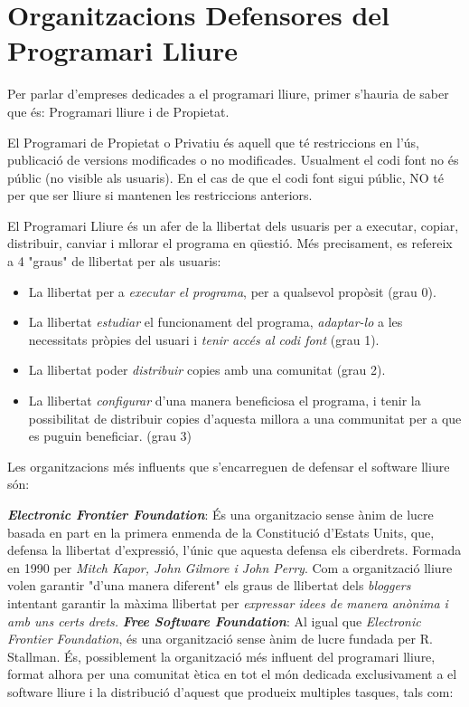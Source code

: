 \section{Organitzacions Defensores del Programari Lliure}

Per parlar d'empreses dedicades a el programari lliure, primer s'hauria de saber que és: Programari lliure i de Propietat.

El Programari de Propietat o Privatiu és aquell que té restriccions en l'ús, publicació de versions modificades o no modificades. Usualment el codi font no és públic (no visible als usuaris). En el cas de que el codi font sigui públic, NO té per que ser lliure si mantenen les restriccions anteriors. \cite{ProgPro}

El Programari Lliure és un afer de la llibertat dels usuaris per a executar, copiar, distribuir, canviar i mllorar el programa en qüestió. Més precisament, es refereix a 4 "graus" de llibertat per als usuaris:

	\begin{itemize}
		\item La llibertat per a \textit{executar el programa}, per a qualsevol propòsit (grau  0).
		\item La llibertat \textit{estudiar} el funcionament del programa, \textit{adaptar-lo} a les 			necessitats pròpies del usuari i \textit{tenir accés al codi font} (grau 1).
		\item La llibertat poder \textit{distribuir} copies amb una comunitat (grau 2).
		\item La llibertat \textit{configurar} d'una manera beneficiosa el programa, i tenir la 		possibilitat de	distribuir copies d'aquesta millora a una communitat per a que es puguin 			beneficiar. (grau 3)
	\end{itemize}

Les organitzacions més influents que s'encarreguen de defensar el software lliure són:
 
\textbf{\emph{Electronic Frontier Foundation}}: És una organitzacio sense ànim de lucre basada en part en la primera enmenda de la Constitució d'Estats Units, que, defensa la llibertat d'expressió, l'únic que aquesta defensa els ciberdrets. Formada en 1990 per \textit{Mitch Kapor, John Gilmore i John Perry}. Com a organització lliure volen garantir "d'una manera diferent" els graus de llibertat dels \emph{bloggers} intentant garantir la màxima llibertat per \textit{expressar idees de manera anònima i amb uns certs drets.} \cite{OrgDefEFF}
 \cite{OrgDefEFFII}
\textbf{\emph{Free Software Foundation}}: Al igual que \emph{Electronic Frontier Foundation}, és una 		organització sense ànim de lucre fundada per R. Stallman. És, possiblement la organització més 		influent del programari lliure, format alhora per una comunitat ètica en tot el món dedicada 		exclusivament a el software lliure i la distribució d'aquest que produeix multiples tasques, tals com:

